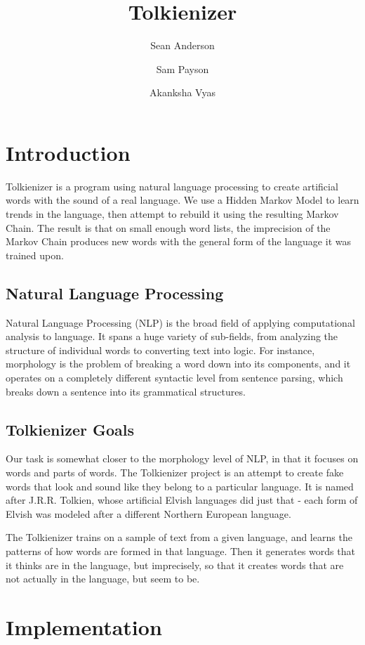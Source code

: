 \documentclass[twocolumn]{article}
\begin{document}
\title{Tolkienizer}
\author{Sean Anderson \and Sam Payson \and Akanksha Vyas}

\section{Introduction}

Tolkienizer is a program using natural language processing to create artificial words with the sound of a real language.  We use a Hidden Markov Model to learn trends in the language, then attempt to rebuild it using the resulting Markov Chain.  The result is that on small enough word lists, the imprecision of the Markov Chain produces new words with the general form of the language it was trained upon.

\subsection{Natural Language Processing}

Natural Language Processing (NLP) is the broad field of applying computational analysis to language.  It spans a huge variety of sub-fields, from analyzing the structure of individual words to converting text into logic.  For instance, morphology is the problem of breaking a word down into its components, and it operates on a completely different syntactic level from sentence parsing, which breaks down a sentence into its grammatical structures.

\subsection{Tolkienizer Goals}

Our task is somewhat closer to the morphology level of NLP, in that it focuses on words and parts of words.  The Tolkienizer project is an attempt to create fake words that look and sound like they belong to a particular language.  It is named after J.R.R. Tolkien, whose artificial Elvish languages did just that - each form of Elvish was modeled after a different Northern European language.

The Tolkienizer trains on a sample of text from a given language, and learns the patterns of how words are formed in that language.  Then it generates words that it thinks are in the language, but imprecisely, so that it creates words that are not actually in the language, but seem to be.

\section{Implementation}
\end{document}
